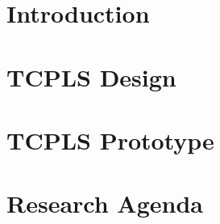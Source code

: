 \section{Introduction}





\section{TCPLS Design}\label{sec:design}






\section{TCPLS Prototype}\label{sec:prototype}



\section{Research Agenda}\label{sec:research}





%


%


